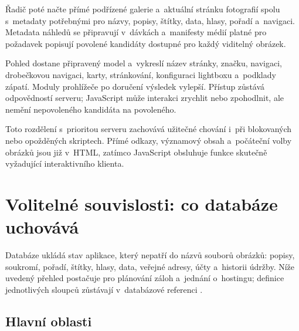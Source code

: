 \documentclass[11pt,a4paper]{article}
\begin{document}
Řadič poté načte přímé podřízené galerie a~aktuální stránku fotografií spolu
s~metadaty potřebnými pro názvy, popisy, štítky, data, hlasy, pořadí a~navigaci.
Metadata náhledů se připravují v~dávkách a~manifesty médií platné pro požadavek
popisují povolené kandidáty dostupné pro každý viditelný obrázek.

Pohled dostane připravený model a~vykreslí název stránky, značku, navigaci,
drobečkovou navigaci, karty, stránkování, konfiguraci lightboxu a~podklady
zápatí. Moduly prohlížeče po doručení výsledek vylepší. Přístup zůstává
odpovědností serveru; JavaScript může interakci zrychlit nebo zpohodlnit, ale
nemění nepovoleného kandidáta na povoleného.

Toto rozdělení s~prioritou serveru zachovává užitečné chování i~při blokovaných
nebo opožděných skriptech. Přímé odkazy, významový obsah a~počáteční volby
obrázků jsou již v~HTML, zatímco JavaScript obsluhuje funkce skutečně vyžadující
interaktivního klienta.

\section{Volitelné souvislosti: co databáze uchovává}
\label{sec:database}

Databáze ukládá stav aplikace, který nepatří do názvů souborů obrázků: popisy,
soukromí, pořadí, štítky, hlasy, data, veřejné adresy, účty a~historii údržby.
Níže uvedený přehled postačuje pro plánování záloh a~jednání o~hostingu;
definice jednotlivých sloupců zůstávají v~databázové referenci \cite{database}.

\subsection{Hlavní oblasti}
\end{document}
